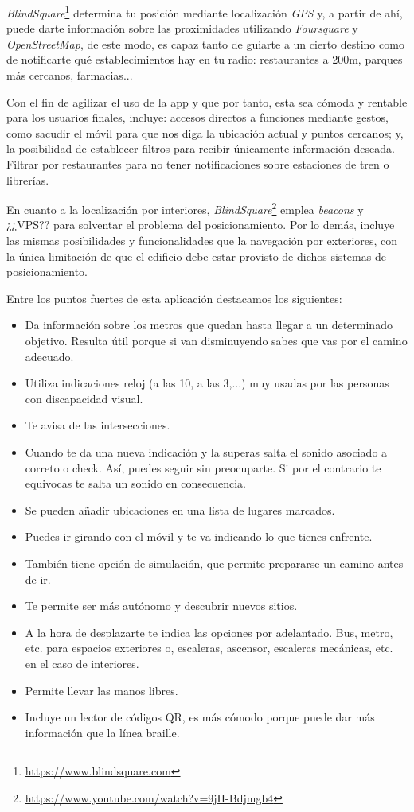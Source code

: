 \documentclass{article}
\begin{document}
	    \textit{BlindSquare}\footnote{\url{https://www.blindsquare.com}} determina tu posición mediante localización \textit{GPS} y, a partir de ahí, puede darte información sobre las proximidades utilizando \textit{Foursquare} y \textit{OpenStreetMap}, de este modo, es capaz tanto de guiarte a un cierto destino como de notificarte qué establecimientos hay en tu radio: restaurantes a 200m, parques más cercanos, farmacias...
	
	    Con el fin de agilizar el uso de la app y que por tanto, esta sea cómoda y rentable para los usuarios finales, incluye: accesos directos a funciones mediante gestos, como sacudir el móvil para que nos diga la ubicación actual y puntos cercanos; y, la posibilidad de establecer filtros para recibir únicamente información deseada. Filtrar por restaurantes para no tener notificaciones sobre estaciones de tren o librerías.
	
	    En cuanto a la localización por interiores, \textit{BlindSquare}\footnote{\url{https://www.youtube.com/watch?v=9jH-Bdjmgb4}} emplea \textit{beacons} y ¿¿VPS?? para solventar el problema del posicionamiento. Por lo demás, incluye las mismas posibilidades y funcionalidades que la navegación por exteriores, con la única limitación de que el edificio debe estar provisto de dichos sistemas de posicionamiento.
	
	    Entre los puntos fuertes de esta aplicación destacamos los siguientes:
	    \begin{itemize}
		    \item Da información sobre los metros que quedan hasta llegar a un determinado objetivo. Resulta útil porque si van disminuyendo sabes que vas por el camino adecuado.
		    \item Utiliza indicaciones reloj (a las 10, a las 3,...) muy usadas por las personas con discapacidad visual.
		    \item Te avisa de las intersecciones. 
		    \item Cuando te da una nueva indicación y la superas salta el sonido asociado a correto o check. Así, puedes seguir sin preocuparte. Si por el contrario te equivocas te salta un sonido en consecuencia.
		    \item Se pueden añadir ubicaciones en una lista de lugares marcados.
		    \item Puedes ir girando con el móvil y te va indicando lo que tienes enfrente. 
		    \item También tiene opción de simulación, que permite prepararse un camino antes de ir.
		    \item Te permite ser más autónomo y descubrir nuevos sitios.
		    \item A la hora de desplazarte te indica las opciones por adelantado. Bus, metro, etc. para espacios exteriores o, escaleras, ascensor, escaleras mecánicas, etc. en el caso de interiores.
		    \item Permite llevar las manos libres.
		    \item Incluye un lector de códigos QR, es más cómodo porque puede dar más información que la línea braille.
	    \end{itemize}
\end{document}
